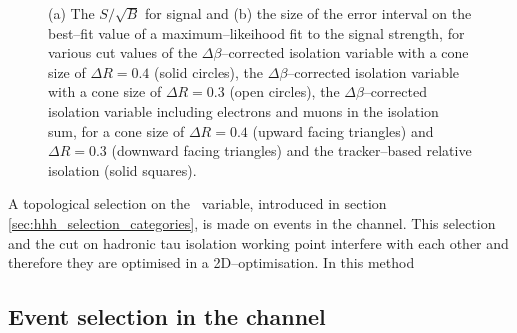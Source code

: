 \begin{figure}[h!]
\caption{(a) The $S/\sqrt{B}$ for \Ztautau signal and (b) the size of the error interval on 
the best--fit value of a maximum--likeihood fit to the \Ztautau signal strength,
for various cut values of the $\Delta\beta$--corrected
isolation variable with a cone size of $\Delta R = 0.4$ (solid circles), 
the $\Delta\beta$--corrected isolation variable with a cone size of $\Delta R = 0.3$ (open circles),
the $\Delta\beta$--corrected isolation variable including electrons and muons in the isolation
sum, for a cone size of $\Delta R =0.4$ (upward facing triangles) and $\Delta R =0.3$ (downward facing triangles) and
the tracker--based relative isolation (solid squares).}
\label{fig:mssm_selection_mt_muons}
\end{figure}

A topological selection on the \mT~variable, 
introduced in section \ref{sec:hhh_selection_categories}, is made on 
events in the \mutau channel. This selection and the
cut on hadronic tau isolation working point interfere 
with each other and therefore they are optimised in a 2D--optimisation. 
In this method 





\subsection{\texorpdfstring{Event selection in the \etau channel}{Event selection in the e tau channel}}
\label{sec:mssm_eventsel_et}

